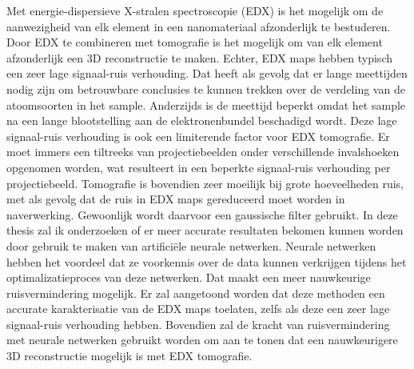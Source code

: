 \documentclass{report}
\begin{document}
Met energie-dispersieve X-stralen spectroscopie (EDX) is het mogelijk om de aanwezigheid van elk element in een nanomateriaal afzonderlijk te bestuderen. Door EDX te combineren met tomografie is het mogelijk om van elk element afzonderlijk een 3D reconstructie te maken. Echter, EDX maps hebben typisch een zeer lage signaal-ruis verhouding. Dat heeft als gevolg dat er lange meettijden nodig zijn om betrouwbare conclusies te kunnen trekken over de verdeling van de atoomsoorten in het sample. Anderzijds is de meettijd beperkt omdat het sample na een lange blootstelling aan de elektronenbundel beschadigd wordt. Deze lage signaal-ruis verhouding is ook een limiterende factor voor EDX tomografie. Er moet immers een tiltreeks van projectiebeelden onder verschillende invalshoeken opgenomen worden, wat resulteert in een beperkte signaal-ruis verhouding per projectiebeeld. Tomografie is bovendien zeer moeilijk bij grote hoeveelheden ruis, met als gevolg dat de ruis in EDX maps gereduceerd moet worden in naverwerking. Gewoonlijk wordt daarvoor een gaussische filter gebruikt. In deze thesis zal ik onderzoeken of er meer accurate resultaten bekomen kunnen worden door gebruik te maken van artificiële neurale netwerken. Neurale netwerken hebben het voordeel dat ze voorkennis over de data kunnen verkrijgen tijdens het optimalizatieproces van deze netwerken. Dat maakt een meer nauwkeurige ruisvermindering mogelijk. Er zal aangetoond worden dat deze methoden een accurate karakterisatie van de EDX maps toelaten, zelfs als deze een zeer lage signaal-ruis verhouding hebben. Bovendien zal de kracht van ruisvermindering met neurale netwerken gebruikt worden om aan te tonen dat een nauwkeurigere 3D reconstructie mogelijk is met EDX tomografie.
\end{document}
